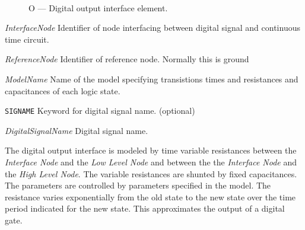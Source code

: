 
\begin{figure}[h]
\centering
\ 
\caption{O --- Digital output interface element.}
\end{figure}


\begin{widelist}
\item[{\it InterfaceNode}]
     Identifier of node interfacing between digital signal and
     continuous time circuit.
\item[{\it ReferenceNode}]
     Identifier of reference node. Normally this is ground
\item[{\it ModelName}]
     Name of the model specifying transistions times and resistances and
     capacitances of each logic state.
\item[{\tt SIGNAME}]
     Keyword for digital signal name. (optional)
\item[{\it DigitalSignalName}]
     Digital signal name.
\end{widelist}



The digital output interface is modeled by time variable resistances between
the {\it Interface Node} and the {\it Low Level Node} and between the
the {\it Interface Node} and the {\it High Level Node}.
The variable resistances are shunted by fixed capacitances.
The parameters are controlled by parameters specified in the model.
The resistance varies exponentially from the old state to the new state over
the time period indicated for the new state.
This approximates the output of a digital gate.



